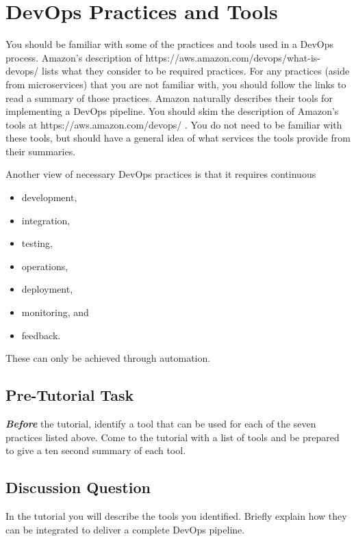 \documentclass{csse4400}
\begin{document}
\section{DevOps Practices and Tools}\label{sec:DevOps-Practices}
You should be familiar with some of the practices and tools used in a DevOps process.
Amazon's description of 
{https://aws.amazon.com/devops/what-is-devops/} \cite{AWS-DevOps} lists what they consider to be required practices.
For any practices (aside from microservices) that you are not familiar with, you should follow the links to read a summary of those practices.
Amazon naturally describes their tools for implementing a DevOps pipeline.
You should skim the description of Amazon's tools at 
{https://aws.amazon.com/devops/} \cite{AWS-DevOps-Tools}.
You do not need to be familiar with these tools, but should have a general idea of what services the tools provide from their summaries.

\newpage
\noindent
Another view of necessary DevOps practices is that it requires continuous
\begin{itemize}[nosep]
    \item development,
    \item integration,
    \item testing,
    \item operations,
    \item deployment,
    \item monitoring, and
    \item feedback.
\end{itemize}
These can only be achieved through automation.

\subsection{Pre-Tutorial Task}
\textit{\textbf{Before}} the tutorial, identify a tool that can be used for each of the seven practices listed above.
Come to the tutorial with a list of tools and be prepared to give a ten second summary of each tool.

\subsection{Discussion Question}
In the tutorial you will describe the tools you identified. Briefly explain how they can be integrated to deliver a complete DevOps pipeline.

\end{document}
